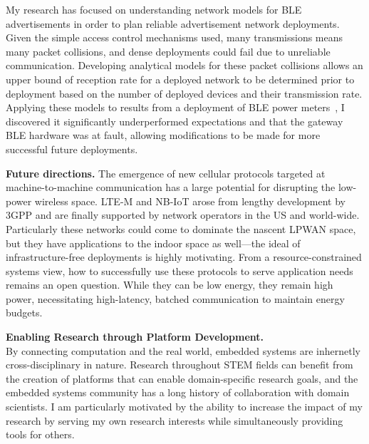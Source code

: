 \documentclass[11pt]{article} %
\begin{document}
My research has focused on understanding network models for BLE advertisements
in order to plan reliable advertisement network deployments.
%
Given the simple access control mechanisms used, many transmissions means many
packet collisions, and dense deployments could fail due to unreliable
communication.
%
Developing analytical models for these packet collisions allows an upper bound
of reception rate for a deployed network to be determined prior to deployment
based on the number of deployed devices and their transmission rate.
%
Applying these models to results from a deployment of BLE power
meters~\cite{debruin15powerblade}, I discovered it significantly underperformed
expectations and that the gateway BLE hardware was at fault, allowing modifications
to be made for more successful future deployments.

\textbf{Future directions.}
%
The emergence of new cellular protocols targeted at machine-to-machine
communication has a large potential for disrupting the low-power wireless
space.
%
LTE-M and NB-IoT arose from lengthy development by 3GPP and are finally
supported by network operators in the US and world-wide. Particularly these
networks could come to dominate the nascent LPWAN space, but they have
applications to the indoor space as well---the ideal of infrastructure-free
deployments is highly motivating.
%
From a resource-constrained systems view, how to successfully use these
protocols to serve application needs remains an open question.
%
While they can be low energy, they remain high power, necessitating high-latency,
batched communication to maintain energy budgets.

\bigskip
\textbf{\textsf{\large Enabling Research through Platform Development.}}\\
By connecting computation and the real world, embedded systems are inhernetly
cross-disciplinary in nature.
%
Research throughout STEM fields can benefit from the creation of platforms that
can enable domain-specific research goals,
and the embedded systems community has a long history of collaboration with
domain scientists.
%
I am particularly motivated by the ability to increase the impact of my research
by serving my own research interests while simultaneously providing tools for others.
\end{document}
